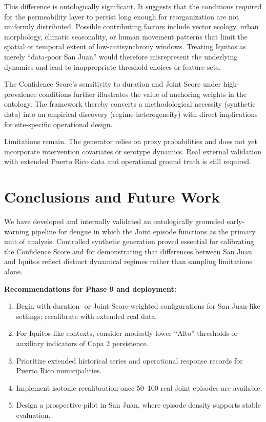 \documentclass[11pt,a4paper]{article}
\begin{document}
This difference is ontologically significant. It suggests that the conditions required for the permeability layer to persist long enough for reorganization are not uniformly distributed. Possible contributing factors include vector ecology, urban morphology, climatic seasonality, or human movement patterns that limit the spatial or temporal extent of low-antisynchrony windows. Treating Iquitos as merely “data-poor San Juan” would therefore misrepresent the underlying dynamics and lead to inappropriate threshold choices or feature sets.

The Confidence Score’s sensitivity to duration and Joint Score under high-prevalence conditions further illustrates the value of anchoring weights in the ontology. The framework thereby converts a methodological necessity (synthetic data) into an empirical discovery (regime heterogeneity) with direct implications for site-specific operational design.

Limitations remain. The generator relies on proxy probabilities and does not yet incorporate intervention covariates or serotype dynamics. Real external validation with extended Puerto Rico data and operational ground truth is still required.

\section{Conclusions and Future Work}

We have developed and internally validated an ontologically grounded early-warning pipeline for dengue in which the Joint episode functions as the primary unit of analysis. Controlled synthetic generation proved essential for calibrating the Confidence Score and for demonstrating that differences between San Juan and Iquitos reflect distinct dynamical regimes rather than sampling limitations alone.

\textbf{Recommendations for Phase 9 and deployment:}
\begin{enumerate}
    \item Begin with duration- or Joint-Score-weighted configurations for San Juan-like settings; recalibrate with extended real data.
    \item For Iquitos-like contexts, consider modestly lower “Alto” thresholds or auxiliary indicators of Capa 2 persistence.
    \item Prioritize extended historical series and operational response records for Puerto Rico municipalities.
    \item Implement isotonic recalibration once 50--100 real Joint episodes are available.
    \item Design a prospective pilot in San Juan, where episode density supports stable evaluation.
\end{enumerate}
\end{document}
